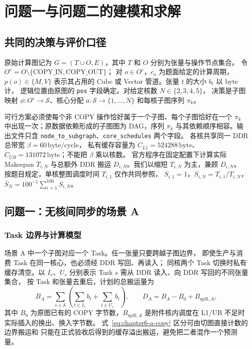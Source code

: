 \section{问题一与问题二的建模和求解}

\subsection{共同的决策与评价口径}
原始计算图记为 $G=(T\cup O,E)$，其中 $T$ 和 $O$ 分别为张量与操作节点集合。
令 $O^{\mathrm c}=O\setminus\{\mathrm{COPY\_IN},\mathrm{COPY\_OUT}\}$；
对 $o\in O^{\mathrm c}$，$c_o$ 为题面给定的计算周期，$p(o)\in\{M,V\}$
表示其占用的 Cube 或 Vector 管道。张量 $t$ 的大小 $b_t$ 以 byte 计，
逻辑位置由原图的 \texttt{pos} 字段确定。对给定核数 $N\in\{2,3,4,5\}$，
决策是子图映射 $\phi:O^{\mathrm c}\to\mathcal S$、核心分配
$a:\mathcal S\to\{1,\ldots,N\}$ 和每核子图序列 $\pi_k$。

可行方案必须使每个非 COPY 操作恰好属于一个子图、每个子图恰好在一个
$\pi_k$ 中出现一次；原数据依赖形成的子图图为 DAG，序列 $\pi_k$
与其依赖顺序相容。输出文件只含
\texttt{node\_to\_subgraph}、\texttt{core\_schedules} 两个字段。
各核共享同一 DDR 总带宽 $\beta=60\,\mathrm{byte/cycle}$，
私有缓存容量为 $C_{L1}=524288\,\mathrm{byte}$、
$C_{UB}=131072\,\mathrm{byte}$；不能把 $\beta$ 乘以核数。
官方程序在固定配置下计算实际 Makespan $T_{i,N}$ 与总额外 DDR 搬运
$D_{i,N}$。我们以缩短 $T_{i,N}$ 为主，兼顾 $D_{i,N}$。
按题目规定，单核整图调度时间 $T_{i,1}$ 仅作共同参照，
$S_{i,1}=1$，$S_{i,N}=T_{i,1}/T_{i,N}$，
$\bar S_N=100^{-1}\sum_{i=1}^{100}S_{i,N}$。

\subsection{问题一：无核间同步的场景 A}
\subsubsection{Task 边界与计算模型}
场景 A 中一个子图对应一个 Task。任一张量只要跨越子图边界，
即使生产与消费 Task 在同一核心，也必须经 DDR 写回、再读入；
同核两个 Task 切换时私有缓存清空。以 $I_s$、$U_s$ 分别表示
Task $s$ 需从 DDR 读入、向 DDR 写回的不同张量集合，
按 Task 和张量去重后，计划的总搬运量为
\begin{equation}
B_A=\sum_{s\in\mathcal S}\left(\sum_{t\in I_s}b_t+\sum_{t\in U_s}b_t\right),
\qquad D_A=B_A-B_0+B_{\mathrm{spill},A},
\label{eq:chapter6-a-copy}
\end{equation}
其中 $B_0$ 为原图已有的 COPY 字节数，$B_{\mathrm{spill},A}$
是附件核内调度在 L1/UB 不足时实际插入的换出、换入字节数。
式~\eqref{eq:chapter6-a-copy} 区分可由切图直接计数的边界搬运和
只能在正式验收后得到的缓存溢出搬运，避免把二者混作一个预测量。

